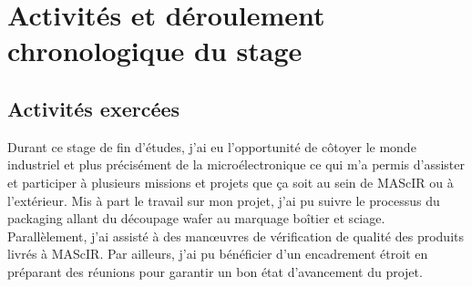 \documentclass[11pt, a4paper, twoside]{book}
\begin{document}
\section{Activités et déroulement chronologique du stage}
\subsection{Activités exercées}
Durant ce stage de fin d’études, j’ai eu l’opportunité de côtoyer le monde industriel et plus précisément de la microélectronique ce qui m’a permis d’assister et participer à plusieurs missions et projets que ça soit au sein de MAScIR ou à l’extérieur. Mis à part le travail sur mon projet, j’ai pu suivre le processus du packaging allant du découpage wafer au marquage boîtier et sciage. Parallèlement, j’ai assisté à des manœuvres de vérification de qualité des produits livrés à MAScIR. Par ailleurs, j’ai pu bénéficier d’un encadrement étroit en préparant des réunions pour garantir un bon état d’avancement du projet.
\end{document}
